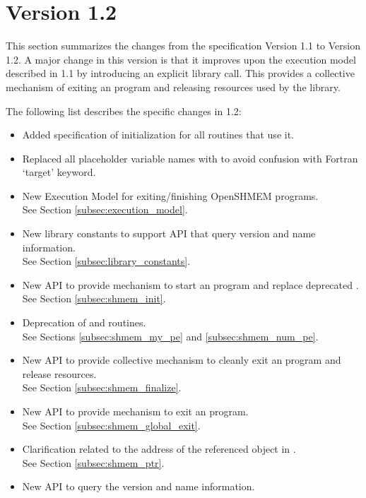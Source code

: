 \section{Version 1.2}
This section summarizes the changes from the \openshmem specification Version 1.1 to Version 1.2.  
A major change in this version is that it improves upon the execution model described in 1.1 by introducing an explicit  library call. This provides a collective mechanism of exiting an \openshmem program and releasing resources used by the library.  



The following list describes the specific changes in 1.2:
\begin{itemize}
\item Added specification of  initialization for all routines that use it.
\item Replaced all placeholder variable names  with  to avoid confusion with Fortran `target' keyword.
\item New Execution Model for exiting/finishing OpenSHMEM programs.
\\See Section  \ref{subsec:execution_model}.
\item New library constants to support API that query version and name information.
\\See Section \ref{subsec:library_constants}.
\item New API  to provide mechanism to start an \openshmem program and replace deprecated .
\\See Section \ref{subsec:shmem_init}.
\item Deprecation of  and  routines.
\\See Sections \ref{subsec:shmem_my_pe} and \ref{subsec:shmem_num_pe}.
\item New API  to provide collective mechanism to cleanly exit an \openshmem program and release resources.
\\See Section \ref{subsec:shmem_finalize}.
\item New API  to provide mechanism to exit an \openshmem program.
\\See Section \ref{subsec:shmem_global_exit}.
\item Clarification related to the address of the referenced object in .
\\See Section \ref{subsec:shmem_ptr}.
\item New API to query the version and name information. 

\end{itemize}
